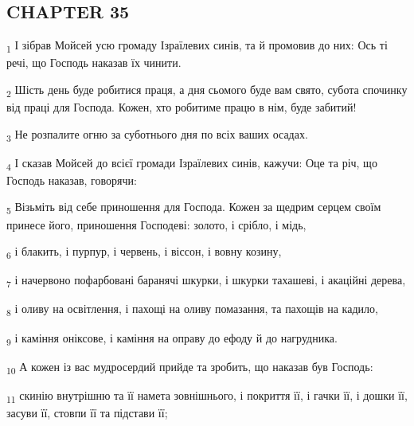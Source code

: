 \subsection{CHAPTER 35}
\begin{tcolorbox}
\textsubscript{1} І зібрав Мойсей усю громаду Ізраїлевих синів, та й промовив до них: Ось ті речі, що Господь наказав їх чинити.
\end{tcolorbox}
\begin{tcolorbox}
\textsubscript{2} Шість день буде робитися праця, а дня сьомого буде вам свято, субота спочинку від праці для Господа. Кожен, хто робитиме працю в нім, буде забитий!
\end{tcolorbox}
\begin{tcolorbox}
\textsubscript{3} Не розпалите огню за суботнього дня по всіх ваших осадах.
\end{tcolorbox}
\begin{tcolorbox}
\textsubscript{4} І сказав Мойсей до всієї громади Ізраїлевих синів, кажучи: Оце та річ, що Господь наказав, говорячи:
\end{tcolorbox}
\begin{tcolorbox}
\textsubscript{5} Візьміть від себе приношення для Господа. Кожен за щедрим серцем своїм принесе його, приношення Господеві: золото, і срібло, і мідь,
\end{tcolorbox}
\begin{tcolorbox}
\textsubscript{6} і блакить, і пурпур, і червень, і віссон, і вовну козину,
\end{tcolorbox}
\begin{tcolorbox}
\textsubscript{7} і начервоно пофарбовані баранячі шкурки, і шкурки тахашеві, і акаційні дерева,
\end{tcolorbox}
\begin{tcolorbox}
\textsubscript{8} і оливу на освітлення, і пахощі на оливу помазання, та пахощів на кадило,
\end{tcolorbox}
\begin{tcolorbox}
\textsubscript{9} і каміння оніксове, і каміння на оправу до ефоду й до нагрудника.
\end{tcolorbox}
\begin{tcolorbox}
\textsubscript{10} А кожен із вас мудросердий прийде та зробить, що наказав був Господь:
\end{tcolorbox}
\begin{tcolorbox}
\textsubscript{11} скинію внутрішню та її намета зовнішнього, і покриття її, і гачки її, і дошки її, засуви її, стовпи її та підстави її;
\end{tcolorbox}
